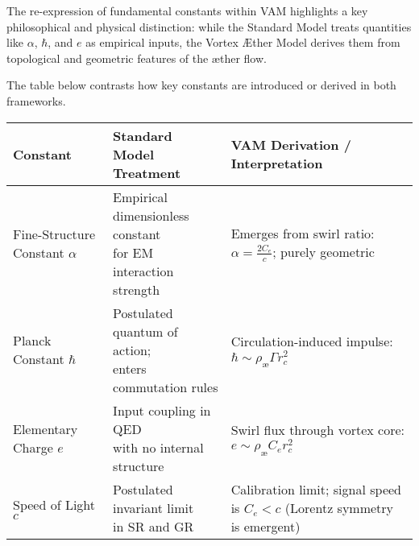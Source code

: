 The re-expression of fundamental constants within VAM highlights a key philosophical and physical distinction: while the Standard Model treats quantities like $\alpha$, $\hbar$, and $e$ as empirical inputs, the Vortex Æther Model derives them from topological and geometric features of the æther flow.

The table below contrasts how key constants are introduced or derived in both frameworks.

\begin{table}[H]
    \centering
    \footnotesize
    \renewcommand{\arraystretch}{1.3}
    \begin{tabular}{|l|l|l|}
        \hline
        \textbf{Constant} & \textbf{Standard Model Treatment} & \textbf{VAM Derivation / Interpretation} \\
        \hline
        \makecell[l]{Fine-Structure \\ Constant $\alpha$} &
        \makecell[l]{Empirical dimensionless constant \\ for EM interaction strength} &
        \makecell[l]{Emerges from swirl ratio: \\ $\alpha = \frac{2 C_e}{c}$; purely geometric} \\
        \hline

        \makecell[l]{Planck Constant \\ $\hbar$} &
        \makecell[l]{Postulated quantum of action; \\ enters commutation rules} &
        \makecell[l]{Circulation-induced impulse: \\ $\hbar \sim \rho_\text{\ae} \Gamma r_c^2$} \\
        \hline

        \makecell[l]{Elementary \\ Charge $e$} &
        \makecell[l]{Input coupling in QED \\ with no internal structure} &
        \makecell[l]{Swirl flux through vortex core: \\ $e \sim \rho_\text{\ae} C_e r_c^2$} \\
        \hline

        \makecell[l]{Speed of \\ Light $c$} &
        \makecell[l]{Postulated invariant limit \\ in SR and GR} &
        \makecell[l]{Calibration limit; \\ signal speed is $C_e < c$ \\ (Lorentz symmetry is emergent)} \\
        \hline


\end{tabular}
\end{table}
